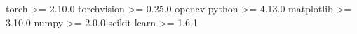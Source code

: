 torch >= 2.10.0
torchvision >= 0.25.0
opencv-python >= 4.13.0
matplotlib >= 3.10.0
numpy >= 2.0.0
scikit-learn >= 1.6.1
